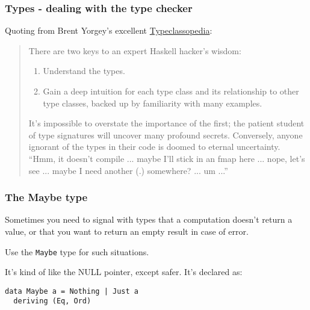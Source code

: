 \documentclass{beamer}
\begin{document}
\begin{frame}[fragile]
\frametitle{Types - dealing with the type checker}

Quoting from Brent Yorgey's excellent
\href{http://www.haskell.org/haskellwiki/Typeclassopedia}{Typeclassopedia}:

{\small
\begin{quote}
There are two keys to an expert Haskell hacker's wisdom:

\begin{enumerate}
\item Understand the types.
\item Gain a deep intuition for each type class and its relationship
  to other type classes, backed up by familiarity with many examples.
\end{enumerate}

It's impossible to overstate the importance of the first; the patient
student of type signatures will uncover many profound
secrets. Conversely, anyone ignorant of the types in their code is
doomed to eternal uncertainty. ``Hmm, it doesn't compile ... maybe I'll
stick in an fmap here ... nope, let's see ... maybe I need another (.)
somewhere? ... um ...''
\end{quote}
}

\end{frame}


\begin{frame}[fragile]
\frametitle{The Maybe type}

Sometimes you need to signal with types that a computation doesn't
return a value, or that you want to return an empty result in case of
error.

\bigskip
Use the \verb+Maybe+ type for such situations.

\bigskip
It's kind of like the NULL pointer, except safer.  It's declared as:

\begin{verbatim}
data Maybe a = Nothing | Just a
  deriving (Eq, Ord)
\end{verbatim}

\end{frame}
\end{document}
